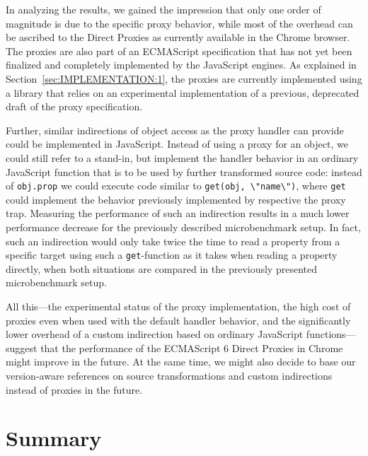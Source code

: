 In analyzing the results, we gained the impression that only one order of magnitude is due to the specific proxy behavior, while most of the overhead can be ascribed to the Direct Proxies as currently available in the Chrome browser.
The proxies are also part of an ECMAScript specification that has not yet been finalized and completely implemented by the JavaScript engines.
As explained in Section~\ref{sec:IMPLEMENTATION:1}, the proxies are currently implemented using a library that relies on an experimental implementation of a previous, deprecated draft of the proxy specification.

Further, similar indirections of object access as the proxy handler can provide could be implemented in JavaScript.
Instead of using a proxy for an object, we could still refer to a stand-in, but implement the handler behavior in an ordinary JavaScript function that is to be used by further transformed source code: instead of \lstinline{obj.prop} we could execute code similar to \lstinline{get(obj, \"name\")}, where \lstinline{get} could implement the behavior previously implemented by respective the proxy trap.
Measuring the performance of such an indirection results in a much lower performance decrease for the previously described microbenchmark setup.
In fact, such an indirection would only take twice the time to read a property from a specific target using such a \lstinline{get}-function as it takes when reading a property directly, when both situations are compared in the previously presented microbenchmark setup.

All this---the experimental status of the proxy implementation, the high cost of proxies even when used with the default handler behavior, and the significantly lower overhead of a custom indirection based on ordinary JavaScript functions---suggest that the performance of the ECMAScript 6 Direct Proxies in Chrome might improve in the future.
At the same time, we might also decide to base our version-aware references on source transformations and custom indirections instead of proxies in the future.


\section{Summary}



